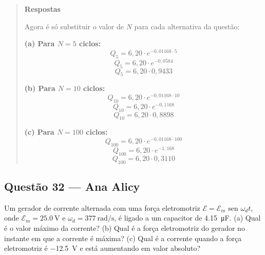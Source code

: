 \documentclass[12pt,a4paper]{article}
\begin{document}
\begin{quote}
\vspace{0.4cm}
\noindent \textbf{Respostas}

\vspace{0.2cm}
\noindent Agora é só substituir o valor de $N$ para cada alternativa da questão:

\vspace{0.2cm}
\noindent \textbf{(a) Para $N = 5$ ciclos:}
\[
Q_5 = 6,20 \cdot e^{-0,01168 \cdot 5}
\]
\[
Q_5 = 6,20 \cdot e^{-0,0584}
\]
\[
Q_5 = 6,20 \cdot 0,9433
\]

\vspace{0.2cm}
\noindent \textbf{(b) Para $N = 10$ ciclos:}
\[
Q_{10} = 6,20 \cdot e^{-0,01168 \cdot 10}
\]
\[
Q_{10} = 6,20 \cdot e^{-0,1168}
\]
\[
Q_{10} = 6,20 \cdot 0,8898
\]


\vspace{0.2cm}
\noindent \textbf{(c) Para $N = 100$ ciclos:}
\[
Q_{100} = 6,20 \cdot e^{-0,01168 \cdot 100}
\]
\[
Q_{100} = 6,20 \cdot e^{-1,168}
\]
\[
Q_{100} = 6,20 \cdot 0,3110
\]

\end{quote}
\vspace{0.2cm}


\subsection{Questão 32 — Ana Alicy}

Um gerador de corrente alternada com uma força eletromotriz $\mathscr{E} = \mathscr{E}_m \text{ sen } \omega_d t$, onde $\mathscr{E}_m = \SI{25,0}{\volt}$ e $\omega_d = \SI{377}{\radian\per\second}$, é ligado a um capacitor de \SI{4,15}{\micro\farad}. (a) Qual é o valor máximo da corrente? (b) Qual é a força eletromotriz do gerador no instante em que a corrente é máxima? (c) Qual é a corrente quando a força eletromotriz é \SI{-12,5}{\volt} e está aumentando em valor absoluto?
\vspace{0.8cm}
\end{document}
